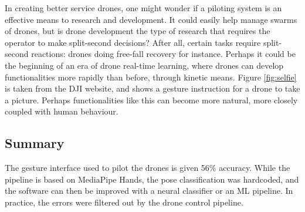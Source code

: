 In creating better service drones, one might wonder if a piloting system is an effective means to research and development. It could easily help manage swarms of drones, but is drone development the type of research that requires the operator to make split-second decisions? After all, certain tasks require split-second reactions: drones doing free-fall recovery for instance. Perhaps it could be the beginning of an era of drone real-time learning, where drones can develop functionalities more rapidly than before, through kinetic means. Figure \ref{fig:selfie} is taken from the DJI website, and shows a gesture instruction for a drone to take a picture. Perhaps functionalities like this can become more natural, more closely coupled with human behaviour.

\subsection{Summary}

The gesture interface used to pilot the drones is given 56\% accuracy. While the pipeline is based on MediaPipe Hands, the pose classification was hardcoded, and the software can then be improved with a neural classifier or an ML pipeline. In practice, the errors were filtered out by the drone control pipeline. 





